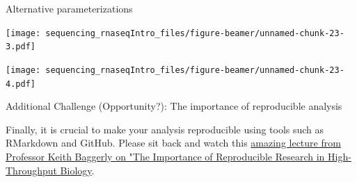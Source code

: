 \documentclass[ignorenonframetext,]{beamer}
\newenvironment{Shaded}{\begin{snugshade}}{\end{snugshade}}
\newcommand{\CommentTok}[1]{\textcolor[rgb]{0.56,0.35,0.01}{\textit{#1}}}
\newcommand{\DataTypeTok}[1]{\textcolor[rgb]{0.13,0.29,0.53}{#1}}
\newcommand{\DecValTok}[1]{\textcolor[rgb]{0.00,0.00,0.81}{#1}}
\newcommand{\KeywordTok}[1]{\textcolor[rgb]{0.13,0.29,0.53}{\textbf{#1}}}
\newcommand{\NormalTok}[1]{#1}
\newcommand{\OperatorTok}[1]{\textcolor[rgb]{0.81,0.36,0.00}{\textbf{#1}}}
\newcommand{\StringTok}[1]{\textcolor[rgb]{0.31,0.60,0.02}{#1}}
\begin{document}
\begin{frame}[fragile]{Alternative parameterizations}
\begin{Shaded}
\end{Shaded}

\texttt{[image: sequencing\_rnaseqIntro\_files/figure-beamer/unnamed-chunk-23-3.pdf]}

\begin{Shaded}
\end{Shaded}

\texttt{[image: sequencing\_rnaseqIntro\_files/figure-beamer/unnamed-chunk-23-4.pdf]}

\end{frame}

\begin{frame}{Additional Challenge (Opportunity?): The importance of
reproducible analysis}
\protect\hypertarget{additional-challenge-opportunity-the-importance-of-reproducible-analysis}{}

Finally, it is crucial to make your analysis reproducible using tools
such as RMarkdown and GitHub. Please sit back and watch this
\href{https://www.youtube.com/watch?v=8QJfNS7XXwA}{amazing lecture from
Professor Keith Baggerly on "The Importance of Reproducible Research in
High-Throughput Biology}.

\end{frame}
\end{document}
